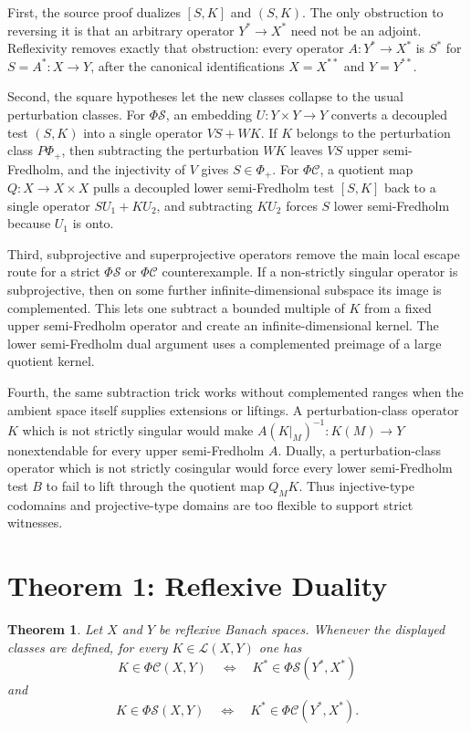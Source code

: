 \documentclass[11pt]{article}
\newtheorem{theorem}{Theorem}
\newcommand{\LL}{\mathcal L}
\newcommand{\PhiS}{\Phi\mathcal S}
\newcommand{\PhiC}{\Phi\mathcal C}
\begin{document}
First, the source proof dualizes \([S,K]\) and \((S,K)\).  The only
obstruction to reversing it is that an arbitrary operator \(Y^*\to X^*\) need
not be an adjoint.  Reflexivity removes exactly that obstruction: every
operator \(A:Y^*\to X^*\) is \(S^*\) for \(S=A^*:X\to Y\), after the canonical
identifications \(X=X^{**}\) and \(Y=Y^{**}\).

Second, the square hypotheses let the new classes collapse to the usual
perturbation classes.  For \(\PhiS\), an embedding
\(U:Y\times Y\to Y\) converts a decoupled test \((S,K)\) into a single
operator \(VS+WK\).  If \(K\) belongs to the perturbation class \(P\Phi_+\),
then subtracting the perturbation \(WK\) leaves \(VS\) upper semi-Fredholm,
and the injectivity of \(V\) gives \(S\in\Phi_+\).  For \(\PhiC\), a quotient
map \(Q:X\to X\times X\) pulls a decoupled lower semi-Fredholm test
\([S,K]\) back to a single operator \(SU_1+KU_2\), and subtracting \(KU_2\)
forces \(S\) lower semi-Fredholm because \(U_1\) is onto.

Third, subprojective and superprojective operators remove the main local
escape route for a strict \(\PhiS\) or \(\PhiC\) counterexample.  If a
non-strictly singular operator is subprojective, then on some further
infinite-dimensional subspace its image is complemented.  This lets one
subtract a bounded multiple of \(K\) from a fixed upper semi-Fredholm operator
and create an infinite-dimensional kernel.  The lower semi-Fredholm dual
argument uses a complemented preimage of a large quotient kernel.

Fourth, the same subtraction trick works without complemented ranges when the
ambient space itself supplies extensions or liftings.  A perturbation-class
operator \(K\) which is not strictly singular would make
\(A(K|_M)^{-1}:K(M)\to Y\) nonextendable for every upper semi-Fredholm \(A\).
Dually, a perturbation-class operator which is not strictly cosingular would
force every lower semi-Fredholm test \(B\) to fail to lift through the quotient
map \(Q_MK\).  Thus injective-type codomains and projective-type domains are
too flexible to support strict witnesses.

\section*{Theorem 1: Reflexive Duality}

\begin{theorem}
Let \(X\) and \(Y\) be reflexive Banach spaces.  Whenever the displayed
classes are defined, for every \(K\in\LL(X,Y)\) one has
\[
K\in\PhiC(X,Y)\quad\Longleftrightarrow\quad K^*\in\PhiS(Y^*,X^*)
\]
and
\[
K\in\PhiS(X,Y)\quad\Longleftrightarrow\quad K^*\in\PhiC(Y^*,X^*).
\]
\end{theorem}
\end{document}

